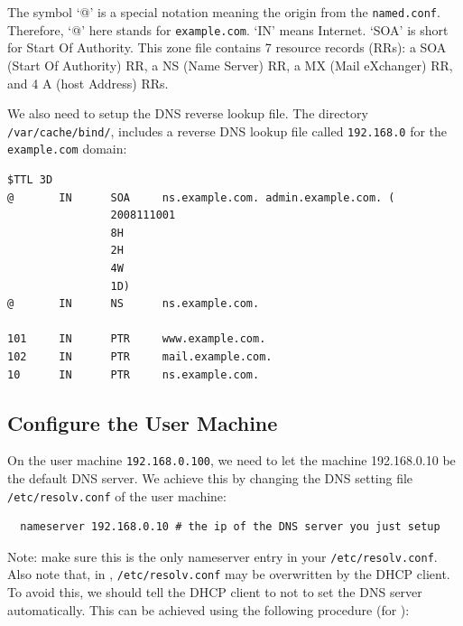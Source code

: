 The symbol `@' is a special notation meaning the origin from the {\tt named.conf}. 
Therefore, `@' here stands for {\tt example.com}. `IN' means Internet. 
`SOA' is short for Start Of Authority.
This zone file contains 7 resource records (RRs): a SOA (Start Of Authority) RR, 
a NS (Name Server) RR, a MX (Mail eXchanger) RR, and 4 A (host Address) RRs.

We also need to setup the DNS reverse lookup file.
The directory \texttt{/var/cache/bind/}, includes a reverse DNS lookup file 
called \texttt{192.168.0} for the \texttt{example.com} domain:
\begin{verbatim}
$TTL 3D
@       IN      SOA     ns.example.com. admin.example.com. (
                2008111001
                8H
                2H
                4W
                1D)
@       IN      NS      ns.example.com.

101     IN      PTR     www.example.com.
102     IN      PTR     mail.example.com.
10      IN      PTR     ns.example.com.
\end{verbatim}


\subsection{Configure the User Machine} 
\label{subsec:user_machine}

On the user machine {\tt 192.168.0.100}, we need to let the machine
192.168.0.10 be the default DNS server. We achieve this by changing
the DNS setting file \texttt{/etc/resolv.conf} of the user machine:

\begin{verbatim}
  nameserver 192.168.0.10 # the ip of the DNS server you just setup
\end{verbatim}

\noindent
Note: make sure this is the only nameserver entry in your \texttt{/etc/resolv.conf}.
Also note that, in \ubuntu, {\tt /etc/resolv.conf} may be overwritten by
the DHCP client.  To avoid this, we should tell the DHCP client to not to set the
DNS server automatically. This can be achieved using the following procedure (for ):


